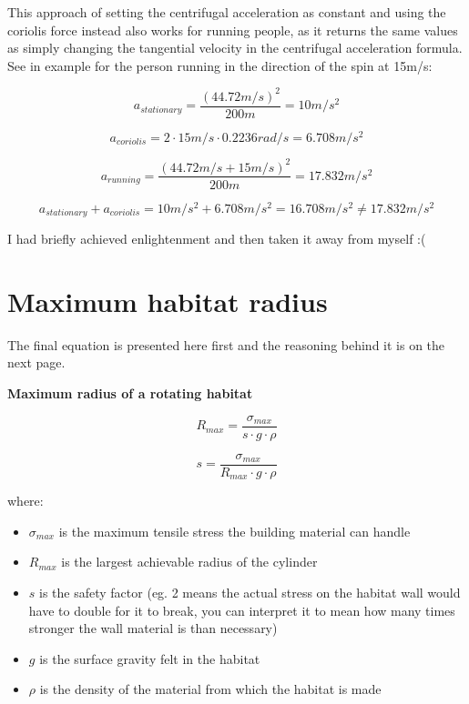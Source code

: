 \documentclass[a4paper]{article}
\begin{document}
	This approach of setting the centrifugal acceleration as constant and using the coriolis force instead also works for running people, as it returns the same values as simply changing the tangential velocity in the centrifugal acceleration formula. See in example for the person running in the direction of the spin at 15m/s:
	
	$$ a_{stationary} = \frac{(44.72m/s)^2}{200m} = 10m/s^2 $$
	
	$$ a_{coriolis} = 2 \cdot 15m/s \cdot 0.2236rad/s = 6.708m/s^2 $$
	
	$$ a_{running} = \frac{(44.72m/s + 15m/s)^2}{200m} = 17.832m/s^2 $$
	
	$$ a_{stationary} + a_{coriolis} = 10m/s^2 + 6.708m/s^2 = 16.708m/s^2 \neq 17.832m/s^2 $$
	
	I had briefly achieved enlightenment and then taken it away from myself :(
	
	\fi
	
	\pagebreak
	
	\section{Maximum habitat radius}
	
	The final equation is presented here first and the reasoning behind it is on the next page.
	
	\begin{center}
		\textbf{Maximum radius of a rotating habitat}
	\end{center}
	
	$$ R_{max} = \frac{\sigma_{max}}{s \cdot g \cdot \rho} $$
	
	$$ s = \frac{\sigma_{max}}{R_{max} \cdot g \cdot \rho} $$
	
	where:
	
	\begin{itemize}
		\item $\sigma_{max}$ is the maximum tensile stress the building material can handle
		
		\item $R_{max}$ is the largest achievable radius of the cylinder
		
		\item $s$ is the safety factor (eg. 2 means the actual stress on the habitat wall would have to double for it to break, you can interpret it to mean how many times stronger the wall material is than necessary)
		
		\item $g$ is the surface gravity felt in the habitat
		
		\item $\rho$ is the density of the material from which the habitat is made
	\end{itemize}
	
\end{document}
